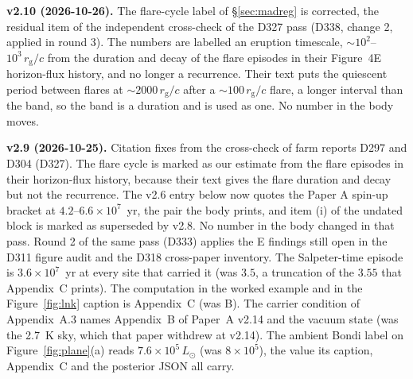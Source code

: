 \documentclass[11pt]{article}
\newcommand{\rg}{\ensuremath{r_{\mathrm{g}}}}
\begin{document}
\textbf{v2.10 (2026-10-26).} The flare-cycle label of \S\ref{sec:madreg} is corrected, the residual item of the independent cross-check of the D327 pass (D338, change 2, applied in round 3). The \citet{Ripperda2022} numbers are labelled an eruption timescale, $\sim 10^{2}$--$10^{3}\,\rg/c$ from the duration and decay of the flare episodes in their Figure~4E horizon-flux history, and no longer a recurrence. Their text puts the quiescent period between flares at $\sim 2000\,\rg/c$ after a $\sim 100\,\rg/c$ flare, a longer interval than the band, so the band is a duration and is used as one. No number in the body moves.

\textbf{v2.9 (2026-10-25).} Citation fixes from the cross-check of farm reports D297 and D304 (D327). The \citet{Ripperda2022} flare cycle is marked as our estimate from the flare episodes in their horizon-flux history, because their text gives the flare duration and decay but not the recurrence. The v2.6 entry below now quotes the Paper A spin-up bracket at $4.2$--$6.6\times10^{7}$~yr, the pair the body prints, and item (i) of the undated block is marked as superseded by v2.8. No number in the body changed in that pass. Round 2 of the same pass (D333) applies the E findings still open in the D311 figure audit and the D318 cross-paper inventory. The Salpeter-time episode is $3.6\times10^{7}$~yr at every site that carried it (was $3.5$, a truncation of the $3.55$ that Appendix~C prints). The computation in the worked example and in the Figure~\ref{fig:lnk} caption is Appendix~C (was B). The carrier condition of Appendix~A.3 names Appendix~B of Paper~A v2.14 and the vacuum state (was the 2.7~K sky, which that paper withdrew at v2.14). The ambient Bondi label on Figure~\ref{fig:plane}(a) reads $7.6\times10^{5}\,L_{\odot}$ (was $8\times10^{5}$), the value its caption, Appendix~C and the posterior JSON all carry.
\end{document}
